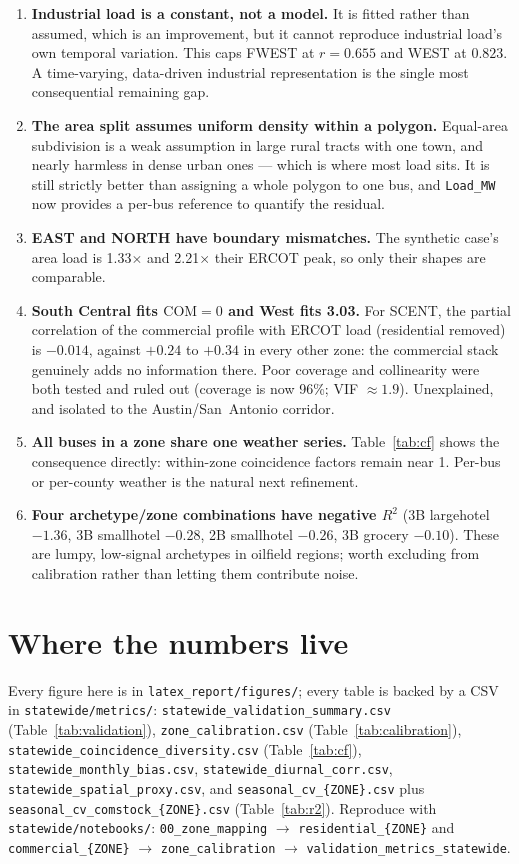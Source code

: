 \documentclass[11pt]{article}
\begin{document}
\begin{enumerate}
\item \textbf{Industrial load is a constant, not a model.} It is fitted rather than assumed, which
is an improvement, but it cannot reproduce industrial load's own temporal variation. This caps
FWEST at $r=0.655$ and WEST at $0.823$. A time-varying, data-driven industrial representation is
the single most consequential remaining gap.
\item \textbf{The area split assumes uniform density within a polygon.} Equal-area subdivision is
a weak assumption in large rural tracts with one town, and nearly harmless in dense urban ones ---
which is where most load sits. It is still strictly better than assigning a whole polygon to one
bus, and \texttt{Load\_MW} now provides a per-bus reference to quantify the residual.
\item \textbf{EAST and NORTH have boundary mismatches.} The synthetic case's area load is
1.33$\times$ and 2.21$\times$ their ERCOT peak, so only their shapes are comparable.
\item \textbf{South Central fits $\mathrm{COM}=0$ and West fits 3.03.} For SCENT, the partial
correlation of the commercial profile with ERCOT load (residential removed) is $-0.014$, against
$+0.24$ to $+0.34$ in every other zone: the commercial stack genuinely adds no information there.
Poor coverage and collinearity were both tested and ruled out (coverage is now 96\%; VIF
$\approx1.9$). Unexplained, and isolated to the Austin/San~Antonio corridor.
\item \textbf{All buses in a zone share one weather series.} Table~\ref{tab:cf} shows the
consequence directly: within-zone coincidence factors remain near 1. Per-bus or per-county
weather is the natural next refinement.
\item \textbf{Four archetype/zone combinations have negative $R^2$} (3B largehotel $-1.36$,
3B smallhotel $-0.28$, 2B smallhotel $-0.26$, 3B grocery $-0.10$). These are lumpy, low-signal
archetypes in oilfield regions; worth excluding from calibration rather than letting them
contribute noise.
\end{enumerate}

\section*{Where the numbers live}

Every figure here is in \texttt{latex\_report/figures/}; every table is backed by a CSV in
\texttt{statewide/metrics/}:
\texttt{statewide\_validation\_summary.csv} (Table~\ref{tab:validation}),
\texttt{zone\_calibration.csv} (Table~\ref{tab:calibration}),
\texttt{statewide\_coincidence\_diversity.csv} (Table~\ref{tab:cf}),
\texttt{statewide\_monthly\_bias.csv}, \texttt{statewide\_diurnal\_corr.csv},
\texttt{statewide\_spatial\_proxy.csv}, and \texttt{seasonal\_cv\_\{ZONE\}.csv} plus
\texttt{seasonal\_cv\_comstock\_\{ZONE\}.csv} (Table~\ref{tab:r2}). Reproduce with
\texttt{statewide/notebooks/}: \texttt{00\_zone\_mapping} $\rightarrow$
\texttt{residential\_\{ZONE\}} and \texttt{commercial\_\{ZONE\}} $\rightarrow$
\texttt{zone\_calibration} $\rightarrow$ \texttt{validation\_metrics\_statewide}.
\end{document}
